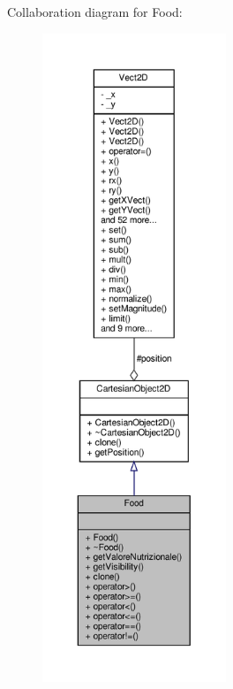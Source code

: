 Collaboration diagram for Food\+:\nopagebreak
\begin{figure}[H]
\begin{center}
\leavevmode
\includegraphics[height=550pt]{classFood__coll__graph}
\end{center}
\end{figure}
